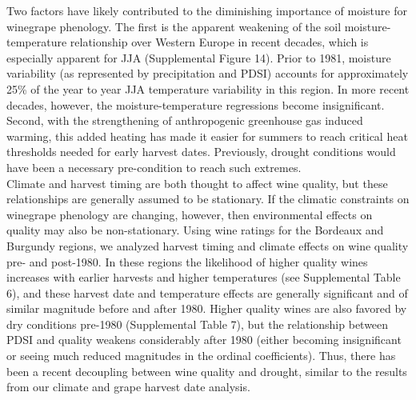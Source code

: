 \documentclass[final]{nature}
\begin{document}
\indent Two factors have likely contributed to the diminishing importance of moisture for winegrape phenology. The first is the apparent weakening of the soil moisture-temperature relationship over Western Europe in recent decades, which is especially apparent for JJA (Supplemental Figure 14). Prior to 1981, moisture variability (as represented by precipitation and PDSI) accounts for approximately 25\% of the year to year JJA temperature variability in this region. In more recent decades, however, the moisture-temperature regressions become insignificant. Second, with the strengthening of anthropogenic greenhouse gas induced warming, this added heating has made it easier for summers to reach critical heat thresholds needed for early harvest dates. Previously, drought conditions would have been a necessary pre-condition to reach such extremes.\\
\indent Climate and harvest timing are both thought to affect wine quality, but these relationships are generally assumed to be stationary. If the climatic constraints on winegrape phenology are changing, however, then environmental effects on quality may also be non-stationary. Using wine ratings for the Bordeaux and Burgundy regions\cite{Broadbent2002}, we analyzed harvest timing and climate effects on wine quality pre- and post-1980. In these regions the likelihood of higher quality wines increases with earlier harvests and higher temperatures (see Supplemental Table 6), and these harvest date and temperature effects are generally significant and of similar magnitude before and after 1980. Higher quality wines are also favored by dry conditions pre-1980 (Supplemental Table 7), but the relationship between PDSI and quality weakens considerably after 1980 (either becoming insignificant or seeing much reduced magnitudes in the ordinal coefficients). Thus, there has been a recent decoupling between wine quality and drought, similar to the results from our climate and grape harvest date analysis.\\
\end{document}
